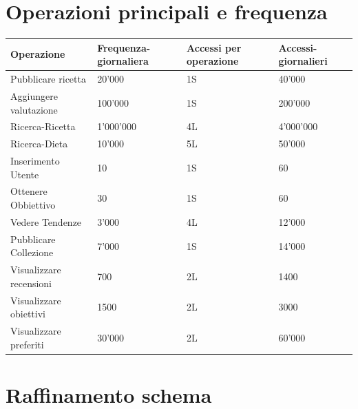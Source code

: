 ﻿\documentclass[a4paper,12pt]{report}
\begin{document}
\section{Operazioni principali e frequenza}
\begin{table}[H]
    \center
        \begin{tabular}{ |p{1.7in}|p{0.8in}|p{1.4in}|p{1.4in}| }
            \hline
            Operazione  & Frequenza-giornaliera  & Accessi per operazione & Accessi-giornalieri\\
            \hline
            Pubblicare ricetta   & 20'000   & 1S & 40'000 \\
            Aggiungere valutazione  &100'000  & 1S & 200'000   \\
            Ricerca-Ricetta   & 1'000'000  & 4L & 4'000'000    \\
            Ricerca-Dieta  & 10'000 & 5L &  50'000\\
            Inserimento Utente & 10& 1S & 60\\
            Ottenere Obbiettivo & 30 & 1S & 60\\
            Vedere Tendenze & 3'000& 4L &12'000\\
            Pubblicare Collezione & 7'000& 1S &14'000 \\
            Visualizzare recensioni & 700 & 2L & 1400 \\
            Visualizzare obiettivi & 1500 & 2L & 3000 \\
            Visualizzare preferiti & 30'000 & 2L & 60'000 \\
            \hline
        \end{tabular}  
    \end{table}
\section{Raffinamento schema}
\end{document}
